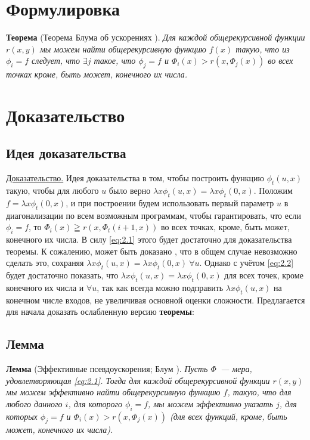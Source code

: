 \documentclass[a4paper,12pt]{report}
\begin{document}
\section{Формулировка}

\textbf{Теорема} (Теорема Блума об ускорениях \cite{Blum}). \textit{Для каждой общерекурсивной функции $r(x,y)$ мы можем найти общерекурсивную функцию $f(x)$ такую, что из $\phi_i = f$ следует, что $\exists j$ такое, что $\phi_j = f$ и $\Phi_i (x) > r(x, \Phi_j (x))$ во всех точках кроме, быть может, конечного их числа.}

\section{Доказательство}

\subsection{Идея доказательства}

\underline{Доказательство.} Идея доказательства в том, чтобы построить функцию $\phi_t(u, x)$ такую, чтобы для любого $u$ было верно $\lambda x \phi_t (u, x) = \lambda x\phi_t(0, x)$. Положим $f=\lambda x \phi_t(0, x)$, и при построении будем использовать первый параметр $u$ в диагонализации по всем возможным программам, чтобы гарантировать, что если $\phi_i = f$, то $\Phi_i(x) \geqq r(x, \Phi_t(i+1, x))$ во всех точках, кроме, быть может, конечного их числа. В силу \eqref{eq:2.1} этого будет достаточно для доказательства теоремы. К сожалению, может быть доказано \cite{Blum}, что в общем случае невозможно сделать это, сохраняя $\lambda x \phi_t(u, x) = \lambda x\phi_t(0, x) \ \forall u$. Однако с учётом \eqref{eq:2.2} будет достаточно показать, что $\lambda x \phi_t(u, x) = \lambda x\phi_t (0, x)$ для всех точек, кроме конечного их числа и $\forall u$, так как всегда можно подправить $\lambda x \phi_t(u, x)$ на конечном числе входов, не увеличивая основной оценки сложности. Предлагается для начала доказать ослабленную версию \textbf{теоремы}:

\subsection{Лемма}

\textbf{Лемма} (Эффективные псевдоускорения; Блум \cite{Blum2}). \textit {Пусть $\Phi$~--- мера, удовлетворяющая \eqref{eq:2.1}. Тогда для каждой общерекурсивной функции $r(x,y)$ мы можем эффективно найти общерекурсивную функцию $f$, такую, что для любого данного $i$, для которого $\phi_i = f$, мы можем эффективно указать $j$, для которых $\phi_j = f$ и $\Phi_i(x) > r(x, \Phi_j(x))$ (для всех функций, кроме, быть может, конечного их числа).}
\end{document}
